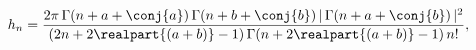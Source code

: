 \[h_{n}=\frac{2\pi\mathop{\Gamma\/}\nolimits\!\left(n+a+\conj{a}\right)\mathop{%
\Gamma\/}\nolimits\!\left(n+b+\conj{b}\right)|\mathop{\Gamma\/}\nolimits\!%
\left(n+a+\conj{b}\right)|^{2}}{\left(2n+2\realpart{(a+b)}-1\right)\mathop{%
\Gamma\/}\nolimits\!\left(n+2\realpart{(a+b)}-1\right)n!},\]